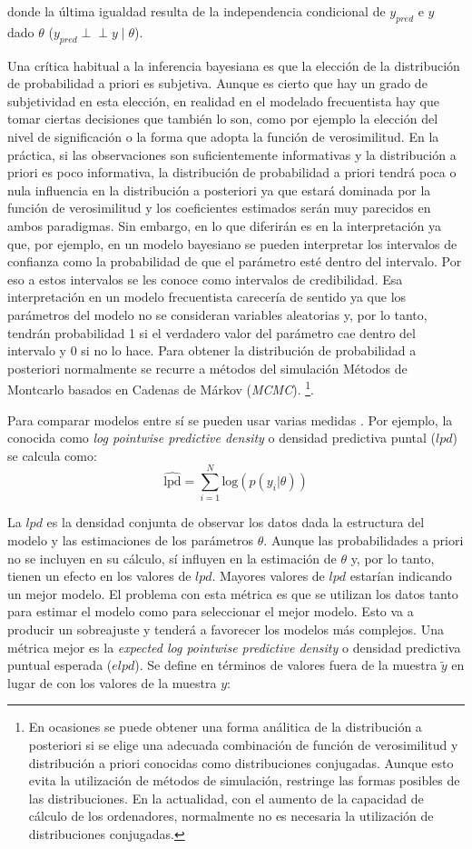\documentclass[
  12pt,
  a4paper,
  extrafontsizes,
  onecolumn,
  openright,
  table]{memoir}
\begin{document}
donde la última igualdad resulta de la independencia condicional de
\(y_{pred}\) e \(y\) dado \(\theta\)
(\(y_{pred} \perp\!\!\!\perp y \mid \theta\)).

Una crítica habitual a la inferencia bayesiana es que la elección de la
distribución de probabilidad a priori es subjetiva. Aunque es cierto que
hay un grado de subjetividad en esta elección, en realidad en el
modelado frecuentista hay que tomar ciertas decisiones que también lo
son, como por ejemplo la elección del nivel de significación o la forma
que adopta la función de verosimilitud. En la práctica, si las
observaciones son suficientemente informativas y la distribución a
priori es poco informativa, la distribución de probabilidad a priori
tendrá poca o nula influencia en la distribución a posteriori ya que
estará dominada por la función de verosimilitud y los coeficientes
estimados serán muy parecidos en ambos paradigmas. Sin embargo, en lo
que diferirán es en la interpretación ya que, por ejemplo, en un modelo
bayesiano se pueden interpretar los intervalos de confianza como la
probabilidad de que el parámetro esté dentro del intervalo. Por eso a
estos intervalos se les conoce como intervalos de credibilidad. Esa
interpretación en un modelo frecuentista carecería de sentido ya que los
parámetros del modelo no se consideran variables aleatorias y, por lo
tanto, tendrán probabilidad 1 si el verdadero valor del parámetro cae
dentro del intervalo y 0 si no lo hace. Para obtener la distribución de
probabilidad a posteriori normalmente se recurre a métodos del
simulación Métodos de Montcarlo basados en Cadenas de Márkov
(\emph{\gls{MCMC}}). \footnote{En ocasiones se puede obtener una forma
  análitica de la distribución a posteriori si se elige una adecuada
  combinación de función de verosimilitud y distribución a priori
  conocidas como distribuciones conjugadas. Aunque esto evita la
  utilización de métodos de simulación, restringe las formas posibles de
  las distribuciones. En la actualidad, con el aumento de la capacidad
  de cálculo de los ordenadores, normalmente no es necesaria la
  utilización de distribuciones conjugadas.}.

Para comparar modelos entre sí se pueden usar varias medidas
\autocite[ver][]{barreda2023}. Por ejemplo, la conocida como \emph{log
pointwise predictive density} o densidad predictiva puntal (\(lpd\)) se
calcula como: \[
\widehat{\mathrm{lpd}} = \sum_{i=1}^{N} \mathrm{log} (p(y_{i} | \theta))
\]

La \(lpd\) es la densidad conjunta de observar los datos dada la
estructura del modelo y las estimaciones de los parámetros \(\theta\).
Aunque las probabilidades a priori no se incluyen en su cálculo, sí
influyen en la estimación de \(\theta\) y, por lo tanto, tienen un
efecto en los valores de \(lpd\). Mayores valores de \(lpd\) estarían
indicando un mejor modelo. El problema con esta métrica es que se
utilizan los datos tanto para estimar el modelo como para seleccionar el
mejor modelo. Esto va a producir un sobreajuste y tenderá a favorecer
los modelos más complejos. Una métrica mejor es la \emph{expected log
pointwise predictive density} o densidad predictiva puntual esperada
(\(elpd\)). Se define en términos de valores fuera de la muestra
\(\tilde{y}\) en lugar de con los valores de la muestra \(y\):
\end{document}
